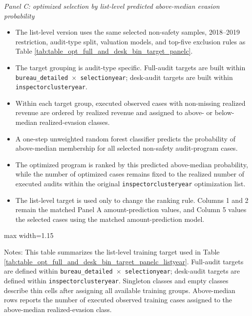 \documentclass{article}
\newcommand{\OutPath}{Output/}%
\newcommand{\OutPath}{../Output/}%
\begin{document}
\noindent\textit{Panel C: optimized selection by list-level predicted above-median evasion probability}
\begin{itemize}
\item The list-level version uses the same selected non-safety samples, 2018--2019 restriction, audit-type split, valuation models, and top-five exclusion rules as Table \ref{tab:table_opt_full_and_desk_bin_target_panelc}.
\item The target grouping is audit-type specific. Full-audit targets are built within \texttt{bureau\_detailed $\times$ selectionyear}; desk-audit targets are built within \texttt{inspectorclusteryear}.
\item Within each target group, executed observed cases with non-missing realized revenue are ordered by realized revenue and assigned to above- or below-median realized-evasion classes.
\item A one-step unweighted random forest classifier predicts the probability of above-median membership for all selected non-safety audit-program cases.
\item The optimized program is ranked by this predicted above-median probability, while the number of optimized cases remains fixed to the realized number of executed audits within the original \texttt{inspectorclusteryear} optimization list.
\item The list-level target is used only to change the ranking rule. Columns 1 and 2 remain the matched Panel A amount-prediction values, and Column 5 values the selected cases using the matched amount-prediction model.
\end{itemize}

\begin{table}[H]\centering
\begin{adjustbox}{max width=1.15\textwidth}
\begin{threeparttable}
\caption{Training Target Summary for List-Level Predicted Above-Median Evasion}
\label{tab:table_opt_full_and_desk_bin_target_listyear_support}
\footnotesize

\begin{tablenotes}[flushleft]
\footnotesize
\item Notes: This table summarizes the list-level training target used in Table \ref{tab:table_opt_full_and_desk_bin_target_panelc_listyear}. Full-audit targets are defined within \texttt{bureau\_detailed $\times$ selectionyear}; desk-audit targets are defined within \texttt{inspectorclusteryear}. Singleton classes and empty classes describe thin cells after assigning all available training groups. Above-median rows reports the number of executed observed training cases assigned to the above-median realized-evasion class.
\end{tablenotes}
\end{threeparttable}
\end{adjustbox}
\end{table}
\end{document}
